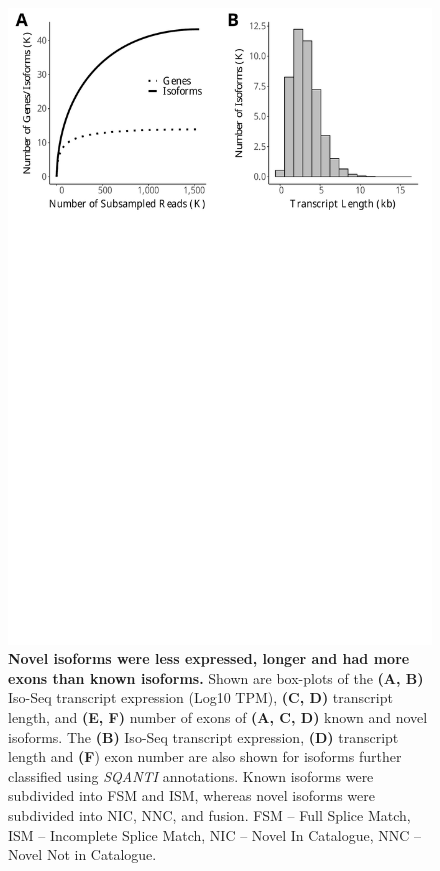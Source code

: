 \begin{figure}[!htp]
	\begin{center}
		\includegraphics[page=4,scale = 0.55]{Figures/IsoSeqWholeTranscriptome.pdf}
	\end{center}
	\captionsetup{width=0.95\textwidth}
	\caption[Comparison of known and novel isoforms detected in the mouse cortex]%
	{\textbf{Novel isoforms were less expressed, longer and had more exons than known isoforms.} Shown are box-plots of the \textbf{(A, B)} Iso-Seq transcript expression (Log10 TPM), \textbf{(C, D)} transcript length, and \textbf{(E, F)} number of exons of \textbf{(A, C, D)} known and novel isoforms. The \textbf{(B)} Iso-Seq transcript expression, \textbf{(D)} transcript length and \textbf{(F}) exon number are also shown for isoforms further classified using \textit{SQANTI} annotations. Known isoforms were subdivided into FSM and ISM, whereas novel isoforms were subdivided into NIC, NNC, and fusion. FSM – Full Splice Match, ISM – Incomplete Splice Match, NIC – Novel In Catalogue, NNC – Novel Not in Catalogue.}   
	\label{fig:isoseq_whole_novel_known_iso_corr}
\end{figure}
	
